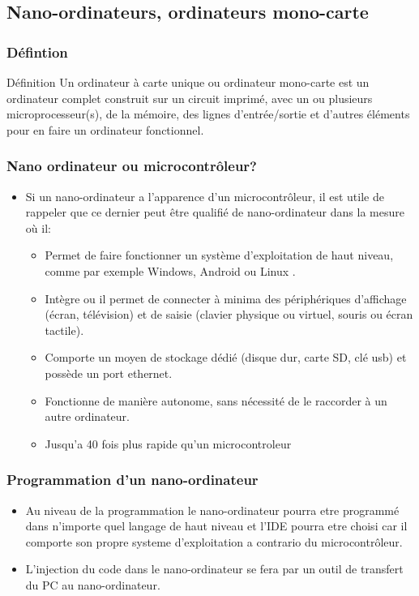 \documentclass{beamer}
\begin{document}
\subsection{Nano-ordinateurs, ordinateurs mono-carte}
\begin{frame}
\frametitle{Défintion}
 \begin{block}{Définition}
 Un ordinateur à carte unique ou ordinateur mono-carte est un ordinateur complet construit sur un circuit imprimé,
 avec un ou plusieurs microprocesseur(s), de la mémoire, des lignes d'entrée/sortie et d'autres éléments pour en faire un ordinateur fonctionnel. 
 \end{block}
\end{frame}
\begin{frame}
\frametitle{Nano ordinateur ou microcontrôleur?}
\begin{itemize}
\item Si un nano-ordinateur a l’apparence d’un microcontrôleur, il est utile de rappeler que ce dernier peut être qualifié de nano-ordinateur dans la mesure où il:
\begin{itemize}
    \item Permet de faire fonctionner un système d’exploitation de haut niveau, comme par exemple Windows, Android ou Linux .
    \item Intègre ou il permet de connecter à minima des périphériques d’affichage (écran, télévision) et de saisie (clavier physique ou virtuel, souris ou écran tactile).
    \item Comporte un moyen de stockage dédié (disque dur, carte SD, clé usb) et possède un port ethernet.
    \item Fonctionne de manière autonome, sans nécessité de le raccorder à un autre ordinateur.
   \item Jusqu'a 40 fois plus rapide qu'un microcontroleur
\end{itemize}
\end{itemize}
\end{frame} 
\begin{frame}
\frametitle{Programmation d'un nano-ordinateur}
\begin{itemize}
    \item Au niveau de la programmation le nano-ordinateur pourra etre programmé dans n'importe quel langage de haut niveau et l'IDE pourra etre choisi car il comporte son propre systeme d'exploitation a contrario du microcontrôleur.
    \item L'injection du code dans le nano-ordinateur se fera par un outil de transfert du PC au nano-ordinateur.
\end{itemize}
\end{frame}	
\end{document}
